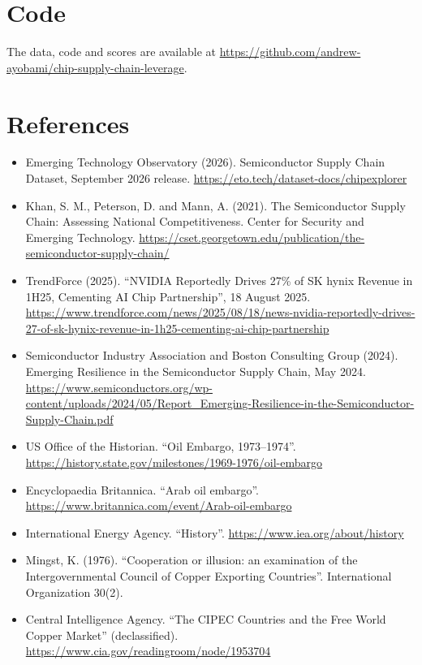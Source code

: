 \documentclass[11pt]{article}
\begin{document}
\section*{Code}

The data, code and scores are available at \url{https://github.com/andrew-ayobami/chip-supply-chain-leverage}.

\section*{References}

\begingroup\small
\begin{itemize}[leftmargin=1.5em, itemindent=-1.5em, label={}, itemsep=2pt]
\item Emerging Technology Observatory (2026). Semiconductor Supply Chain Dataset, September 2026 release. \url{https://eto.tech/dataset-docs/chipexplorer}
\item Khan, S. M., Peterson, D. and Mann, A. (2021). The Semiconductor Supply Chain: Assessing National Competitiveness. Center for Security and Emerging Technology. \url{https://cset.georgetown.edu/publication/the-semiconductor-supply-chain/}
\item TrendForce (2025). ``NVIDIA Reportedly Drives 27\% of SK hynix Revenue in 1H25, Cementing AI Chip Partnership'', 18 August 2025. \url{https://www.trendforce.com/news/2025/08/18/news-nvidia-reportedly-drives-27-of-sk-hynix-revenue-in-1h25-cementing-ai-chip-partnership}
\item Semiconductor Industry Association and Boston Consulting Group (2024). Emerging Resilience in the Semiconductor Supply Chain, May 2024. \url{https://www.semiconductors.org/wp-content/uploads/2024/05/Report_Emerging-Resilience-in-the-Semiconductor-Supply-Chain.pdf}
\item US Office of the Historian. ``Oil Embargo, 1973--1974''. \url{https://history.state.gov/milestones/1969-1976/oil-embargo}
\item Encyclopaedia Britannica. ``Arab oil embargo''. \url{https://www.britannica.com/event/Arab-oil-embargo}
\item International Energy Agency. ``History''. \url{https://www.iea.org/about/history}
\item Mingst, K. (1976). ``Cooperation or illusion: an examination of the Intergovernmental Council of Copper Exporting Countries''. International Organization 30(2).
\item Central Intelligence Agency. ``The CIPEC Countries and the Free World Copper Market'' (declassified). \url{https://www.cia.gov/readingroom/node/1953704}

\end{itemize}
\end{document}
